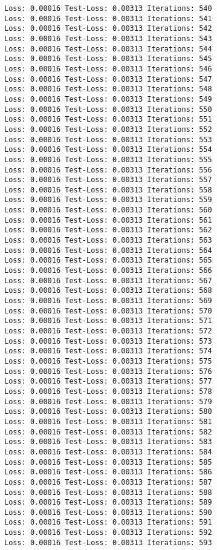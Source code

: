 \documentclass[11pt]{article}
\begin{document}
\begin{Verbatim}[commandchars=\\\{\}]
Loss: 0.00016 Test-Loss: 0.00313 Iterations: 540
Loss: 0.00016 Test-Loss: 0.00313 Iterations: 541
Loss: 0.00016 Test-Loss: 0.00313 Iterations: 542
Loss: 0.00016 Test-Loss: 0.00313 Iterations: 543
Loss: 0.00016 Test-Loss: 0.00313 Iterations: 544
Loss: 0.00016 Test-Loss: 0.00313 Iterations: 545
Loss: 0.00016 Test-Loss: 0.00313 Iterations: 546
Loss: 0.00016 Test-Loss: 0.00313 Iterations: 547
Loss: 0.00016 Test-Loss: 0.00313 Iterations: 548
Loss: 0.00016 Test-Loss: 0.00313 Iterations: 549
Loss: 0.00016 Test-Loss: 0.00313 Iterations: 550
Loss: 0.00016 Test-Loss: 0.00313 Iterations: 551
Loss: 0.00016 Test-Loss: 0.00313 Iterations: 552
Loss: 0.00016 Test-Loss: 0.00313 Iterations: 553
Loss: 0.00016 Test-Loss: 0.00313 Iterations: 554
Loss: 0.00016 Test-Loss: 0.00313 Iterations: 555
Loss: 0.00016 Test-Loss: 0.00313 Iterations: 556
Loss: 0.00016 Test-Loss: 0.00313 Iterations: 557
Loss: 0.00016 Test-Loss: 0.00313 Iterations: 558
Loss: 0.00016 Test-Loss: 0.00313 Iterations: 559
Loss: 0.00016 Test-Loss: 0.00313 Iterations: 560
Loss: 0.00016 Test-Loss: 0.00313 Iterations: 561
Loss: 0.00016 Test-Loss: 0.00313 Iterations: 562
Loss: 0.00016 Test-Loss: 0.00313 Iterations: 563
Loss: 0.00016 Test-Loss: 0.00313 Iterations: 564
Loss: 0.00016 Test-Loss: 0.00313 Iterations: 565
Loss: 0.00016 Test-Loss: 0.00313 Iterations: 566
Loss: 0.00016 Test-Loss: 0.00313 Iterations: 567
Loss: 0.00016 Test-Loss: 0.00313 Iterations: 568
Loss: 0.00016 Test-Loss: 0.00313 Iterations: 569
Loss: 0.00016 Test-Loss: 0.00313 Iterations: 570
Loss: 0.00016 Test-Loss: 0.00313 Iterations: 571
Loss: 0.00016 Test-Loss: 0.00313 Iterations: 572
Loss: 0.00016 Test-Loss: 0.00313 Iterations: 573
Loss: 0.00016 Test-Loss: 0.00313 Iterations: 574
Loss: 0.00016 Test-Loss: 0.00313 Iterations: 575
Loss: 0.00016 Test-Loss: 0.00313 Iterations: 576
Loss: 0.00016 Test-Loss: 0.00313 Iterations: 577
Loss: 0.00016 Test-Loss: 0.00313 Iterations: 578
Loss: 0.00016 Test-Loss: 0.00313 Iterations: 579
Loss: 0.00016 Test-Loss: 0.00313 Iterations: 580
Loss: 0.00016 Test-Loss: 0.00313 Iterations: 581
Loss: 0.00016 Test-Loss: 0.00313 Iterations: 582
Loss: 0.00016 Test-Loss: 0.00313 Iterations: 583
Loss: 0.00016 Test-Loss: 0.00313 Iterations: 584
Loss: 0.00016 Test-Loss: 0.00313 Iterations: 585
Loss: 0.00016 Test-Loss: 0.00313 Iterations: 586
Loss: 0.00016 Test-Loss: 0.00313 Iterations: 587
Loss: 0.00016 Test-Loss: 0.00313 Iterations: 588
Loss: 0.00016 Test-Loss: 0.00313 Iterations: 589
Loss: 0.00016 Test-Loss: 0.00313 Iterations: 590
Loss: 0.00016 Test-Loss: 0.00313 Iterations: 591
Loss: 0.00016 Test-Loss: 0.00313 Iterations: 592
Loss: 0.00016 Test-Loss: 0.00313 Iterations: 593

\end{Verbatim}
\end{document}
